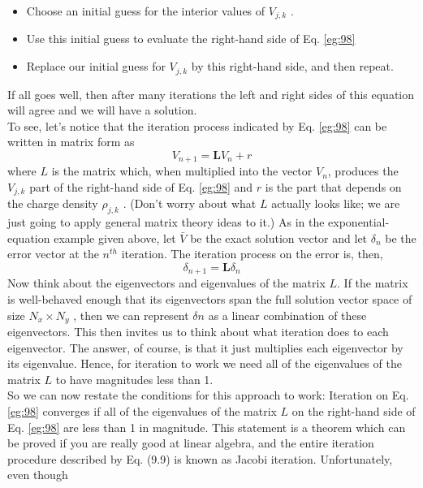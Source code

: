 \documentclass{book}
\theoremstyle{plain}
\theoremstyle{definition}
\numberwithin{exm}{chapter}
\theoremstyle{remark}
\theoremstyle{summary}
\theoremstyle{overview}
\begin{document}
\begin{itemize}
\item Choose an initial guess for the interior values of $V_{j,k}$ .
\item Use this initial guess to evaluate the right-hand side of Eq. \eqref{eg:98}
\item Replace our initial guess for $V_{j,k}$ by this right-hand side, and then repeat.

\end{itemize}
If all goes well, then after many iterations the left and right sides of this equation will agree and we will have a solution. \\
To see, let\rq s notice that the iteration process indicated by Eq. \eqref{eg:98} can be
written in matrix form as
\begin{equation}\label{eq:99}
V_{n+1}=\mathbf{L} V_{n}+r
\end{equation}
where $L$ is the matrix which, when multiplied into the vector $V_n$, produces the
$V_{j,k}$ part of the right-hand side of Eq. \eqref{eg:98} and $r$ is the part that depends on the
charge density $ \rho_{j,k}$ . (Don\rq t worry about what $L$ actually looks like; we are just
going to apply general matrix theory ideas to it.) As in the exponential-equation
example given above, let $\bar{V}$ be the exact solution vector and let $\delta_n$ be the error
vector at the $n^{th}$ iteration. The iteration process on the error is, then,
\begin{equation}\label{eq:910}
\delta_{n+1}=\mathbf{L} \delta_{n}
\end{equation}
Now think about the eigenvectors and eigenvalues of the matrix $L$. If the matrix is
well-behaved enough that its eigenvectors span the full solution vector space of
size $N_x × N_y$ , then we can represent $\delta n$ as a linear combination of these eigenvectors. This then invites us to think about what iteration does to each eigenvector. The answer, of course, is that it just multiplies each eigenvector by its eigenvalue.
Hence, for iteration to work we need all of the eigenvalues of the matrix $L$ to have
magnitudes less than 1.\\
So we can now restate the conditions for this approach to work: Iteration on
Eq. \eqref{eg:98} converges if all of the eigenvalues of the matrix $L$ on the right-hand side
of Eq. \eqref{eg:98} are less than 1 in magnitude. This statement is a theorem which can be
proved if you are really good at linear algebra, and the entire iteration procedure
described by Eq. (9.9) is known as Jacobi iteration. Unfortunately, even though
\end{document}
